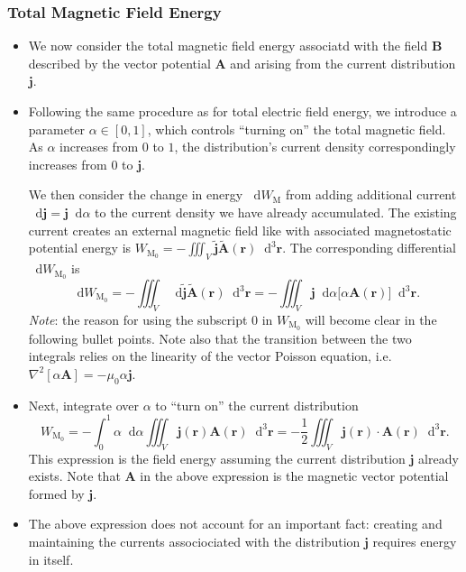 \documentclass[11pt, a4paper]{article}
\newcommand{\diff}{\mathop{}\!\mathrm{d}} %
\newcommand{\dr}{\diff^{3} \r}  %
\renewcommand{\vec}[1]{\bm{#1}} %
\renewcommand{\r}{\vec{r}}
\newcommand{\B}{\vec{B}} %
\newcommand{\A}{\vec{A}} %
\newcommand{\mm}{\mu_{0}}  %
\renewcommand{\j}{\vec{j}}  %
\renewcommand{\laplacian}{\nabla^{2}}
\begin{document}
\subsubsection{Total Magnetic Field Energy}
\begin{itemize}
    \item We now consider the total magnetic field energy associatd with the field $ \B $ described by the vector potential $ \A $ and arising from the current distribution $ \j $. 

    \item Following the same procedure as for total electric field energy, we introduce a parameter $ \alpha \in [0, 1] $, which controls ``turning on'' the total magnetic field. As $ \alpha $ increases from $ 0 $ to $ 1 $, the distribution's current density correspondingly increases from $ 0 $ to $ \j $.

    We then consider the change in energy $ \diff W_{\text{M}} $ from adding additional current $ \diff \j = \j \diff \alpha $ to the current density we have already accumulated. The existing current creates an external magnetic field like with associated magnetostatic potential energy is $ W_{\text{M}_{0}} = - \iiint_{V} \tilde{\j} \tilde{\A}(\r) \dr $. The corresponding differential $ \diff W_{\text{M}_{0}} $ is
    \begin{equation*}
        \diff W_{\text{M}_{0}} = - \iiint_{V} \diff \tilde{\j} \tilde{\A}(\r) \dr = - \iiint_{V} \j \diff \alpha \big[ \alpha \A(\r) \big] \dr.
    \end{equation*}
    \textit{Note}: the reason for using the subscript $ 0 $ in $ W_{\text{M}_{0}} $ will become clear in the following bullet points. Note also that the transition between the two integrals relies on the linearity of the vector Poisson equation, i.e. $ \laplacian[\alpha \A] = - \mm \alpha \j $.

    \item Next, integrate over $ \alpha $ to ``turn on'' the current distribution
    \begin{equation*}
        W_{\text{M}_{0}}  = - \int_{0}^{1} \alpha \diff \alpha \iiint_{V} \j(\r)\A(\r)\dr = - \frac{1}{2} \iiint_{V} \j(\r) \cdot \A(\r) \dr.
    \end{equation*}
    This expression is the field energy assuming the current distribution $ \j $ already exists. Note that $ \A $ in the above expression is the magnetic vector potential formed by $ \j $.
    
    \item The above expression does not account for an important fact: creating and maintaining the currents associociated with the distribution $ \j $ requires energy in itself. 


\end{itemize}
\end{document}

